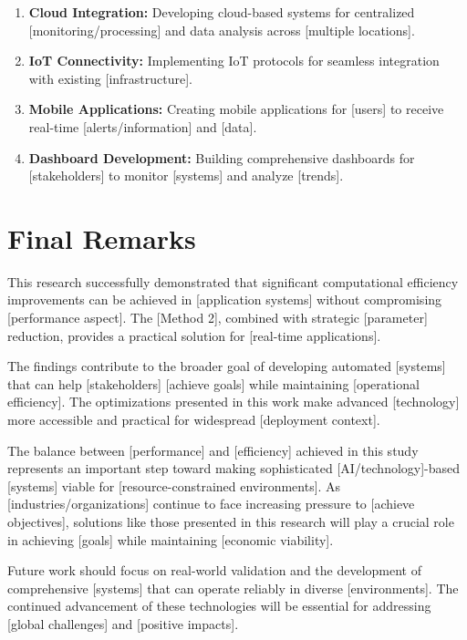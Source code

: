 \begin{enumerate}
\item \textbf{Cloud Integration:} Developing cloud-based systems for centralized [monitoring/processing] and data analysis across [multiple locations].

\item \textbf{IoT Connectivity:} Implementing IoT protocols for seamless integration with existing [infrastructure].

\item \textbf{Mobile Applications:} Creating mobile applications for [users] to receive real-time [alerts/information] and [data].

\item \textbf{Dashboard Development:} Building comprehensive dashboards for [stakeholders] to monitor [systems] and analyze [trends].
\end{enumerate}

\section{Final Remarks}

This research successfully demonstrated that significant computational efficiency improvements can be achieved in [application systems] without compromising [performance aspect]. The [Method 2], combined with strategic [parameter] reduction, provides a practical solution for [real-time applications].

The findings contribute to the broader goal of developing automated [systems] that can help [stakeholders] [achieve goals] while maintaining [operational efficiency]. The optimizations presented in this work make advanced [technology] more accessible and practical for widespread [deployment context].

The balance between [performance] and [efficiency] achieved in this study represents an important step toward making sophisticated [AI/technology]-based [systems] viable for [resource-constrained environments]. As [industries/organizations] continue to face increasing pressure to [achieve objectives], solutions like those presented in this research will play a crucial role in achieving [goals] while maintaining [economic viability].

Future work should focus on real-world validation and the development of comprehensive [systems] that can operate reliably in diverse [environments]. The continued advancement of these technologies will be essential for addressing [global challenges] and [positive impacts].